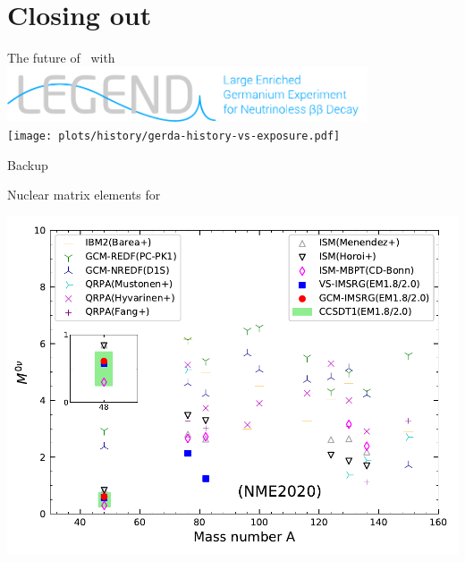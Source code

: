 \documentclass[10pt,aspectratio=169]{beamer}
\begin{document}
\section{Closing out}
\begin{frame}{The future of \onbb\ with \gesix}
  \centering
  \vspace*{0.5cm}
  \includegraphics[width=0.8\textwidth]{logos/legend-logo-wtag.pdf} \\
  \vspace*{1cm}
  \texttt{[image: plots/history/gerda-history-vs-exposure.pdf]} \hspace*{1cm}
\end{frame}
\appendix
\begin{frame}[standout]{}
  Backup
\end{frame}
\begin{frame}{Nuclear matrix elements for \texorpdfstring{\onbb}{0νββ}}
  \begin{center}
    \includegraphics[height=0.9\textheight]{plots/theory/0nbb-nme.pdf}
  \end{center}
\end{frame}
\end{document}
